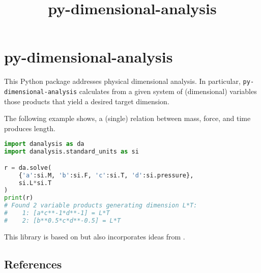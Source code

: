 \documentclass[11pt]{article}
\title{py-dimensional-analysis}
\date{}
\begin{document}
\maketitle

\section{py-dimensional-analysis}
This Python package addresses physical dimensional analysis. In particular, \texttt{py-dimensional-analysis} calculates from a given system of (dimensional) variables those products that yield a desired target dimension.


The following example shows, a (single) relation between mass, force, and time produces length.

\begin{lstlisting}[language=Python]
import danalysis as da
import danalysis.standard_units as si

r = da.solve(
    {'a':si.M, 'b':si.F, 'c':si.T, 'd':si.pressure}, 
    si.L*si.T
)
print(r)
# Found 2 variable products generating dimension L*T:
#    1: [a*c**-1*d**-1] = L*T
#    2: [b**0.5*c*d**-0.5] = L*T
\end{lstlisting}

This library is based on \cite{szirtes2007applied} but also incorporates ideas from \cite{santiago2019first, sonin2001dimensional}.

\subsection{References}

\begingroup
\renewcommand{\section}[2]{}%

\endgroup
\end{document}
